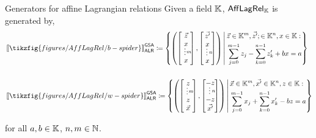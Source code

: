 \documentclass{beamer}
\begin{document}
\begin{frame}{Generators for affine Lagrangian relations}
Given a field \(\mathbb{K}\), \(\ALR\) is generated by,
  \begin{align*}
  &\interp{\tikzfig{figures/AffLagRel/b-spider}}_\abbralagr^\zx
    \coloneqq \left\{ \left(
    \begin{bmatrix}
      \vec z \\ x \vspace*{-.2cm}\\ \vdotsm\\ x
    \end{bmatrix} ,
    \begin{bmatrix}
      \vec {z'} \\ x \vspace*{-.2cm} \\ \vdotsn \\ x
    \end{bmatrix}
    \right) \,\middle|\, \begin{aligned} &\vec z\in\K^m, \vec{z'} ; \in \K^n, x \in \K: \\ &\sum_{j=0}^{m-1} z_j - \sum_{k=0}^{n-1} z_k' + bx = a \end{aligned} \right\} \\
    \\
  &\interp{\tikzfig{figures/AffLagRel/w-spider}}_\abbralagr^\zx
    \coloneqq
    \left\{ \left(
      \begin{bmatrix}
      z \vspace*{-.2cm} \\ \vdotsm \\ z \\  \vec x
      \end{bmatrix} ,
      \begin{bmatrix}
      -z \vspace*{-.2cm} \\ \vdotsn \\ -z \\  \vec {x'}
      \end{bmatrix}
    \right) \,\middle|\, \begin{aligned} & \vec x \in \K^m, \vec{x'}\in \K^n, z\in \K: \\ &\sum_{j=0}^{m-1} x_j + \sum_{k=0}^{n-1} x_k' - bz = a \end{aligned} \right\}
    \end{align*}
    
    for all  \(a,b\in \mathbb{K}\), \(n,m\in \mathbb{N}\).
    
\end{frame}
\end{document}
